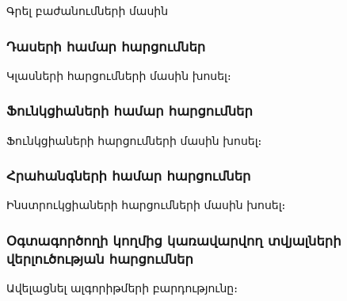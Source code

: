 {
    Գրել բաժանումների մասին

    \subsubsection*{Դասերի համար հարցումներ}\label{subsubsec:classes}
    Կլասների հարցումների մասին խոսել։

    \subsubsection*{Ֆունկցիաների համար հարցումներ}\label{subsubsec:functions}
    Ֆունկցիաների հարցումների մասին խոսել։

    \subsubsection*{Հրահանգների համար հարցումներ}\label{subsubsec:instructions}
    Ինստրուկցիաների հարցումների մասին խոսել։

    \subsubsection*{Օգտագործողի կողմից կառավարվող տվյալների վերլուծության հարցումներ}\label{subsubsec:taintAnalisys}
    Ավելացնել ալգորիթմերի բարդությունը։
}